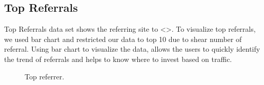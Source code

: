 \subsection{Top Referrals} \label{viztoprefs}
Top Referrals data set shows the referring site to <>. To visualize
top referrals, we used bar chart and restricted our data to top 10 due
to shear number of referral. Using bar chart to visualize the data,
allows the users to quickly identify the trend of referrals and helps
to know where to invest based on traffic. 

\begin{figure}
\centering
{}
\caption{Top referrer.}
\label{fig:topreferrer}
\end{figure}


